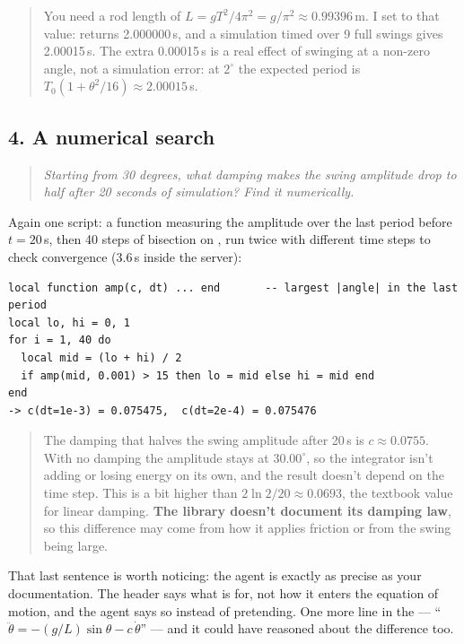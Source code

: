 \begin{quote}
\small
You need a rod length of $L = gT^2/4\pi^2 = g/\pi^2 \approx 0.99396$\,m. I set
 to that value:  returns 2.000000\,s, and a
simulation timed over 9 full swings gives 2.00015\,s. The extra 0.00015\,s is a
real effect of swinging at a non-zero angle, not a simulation error: at
$2^\circ$ the expected period is $T_0(1 + \theta^2/16) \approx 2.00015$\,s.
\end{quote}

\subsection*{4. A numerical search}

\begin{quote}
\small\itshape
Starting from 30 degrees, what damping makes the swing amplitude drop to half
after 20 seconds of simulation? Find it numerically.
\end{quote}

Again one script: a function measuring the amplitude over the last period before
$t = 20$\,s, then 40 steps of bisection on , run twice with
different time steps to check convergence (3.6\,s inside the server):

\begin{lstlisting}[style=plain]
local function amp(c, dt) ... end       -- largest |angle| in the last period
local lo, hi = 0, 1
for i = 1, 40 do
  local mid = (lo + hi) / 2
  if amp(mid, 0.001) > 15 then lo = mid else hi = mid end
end
-> c(dt=1e-3) = 0.075475,  c(dt=2e-4) = 0.075476
\end{lstlisting}

\begin{quote}
\small
The damping that halves the swing amplitude after 20\,s is
$c \approx 0.0755$. With no damping the amplitude stays at $30.00^\circ$, so the
integrator isn't adding or losing energy on its own, and the result doesn't
depend on the time step. This is a bit higher than $2\ln 2/20 \approx 0.0693$,
the textbook value for linear damping. \textbf{The library doesn't document its
damping law}, so this difference may come from how it applies friction or from
the swing being large.
\end{quote}

That last sentence is worth noticing: the agent is exactly as precise as your
documentation. The header says what  is for, not how it enters
the equation of motion, and the agent says so instead of pretending. One more
line in the  --- ``$\ddot\theta = -(g/L)\sin\theta - c\,\dot\theta$''
--- and it could have reasoned about the difference too.

